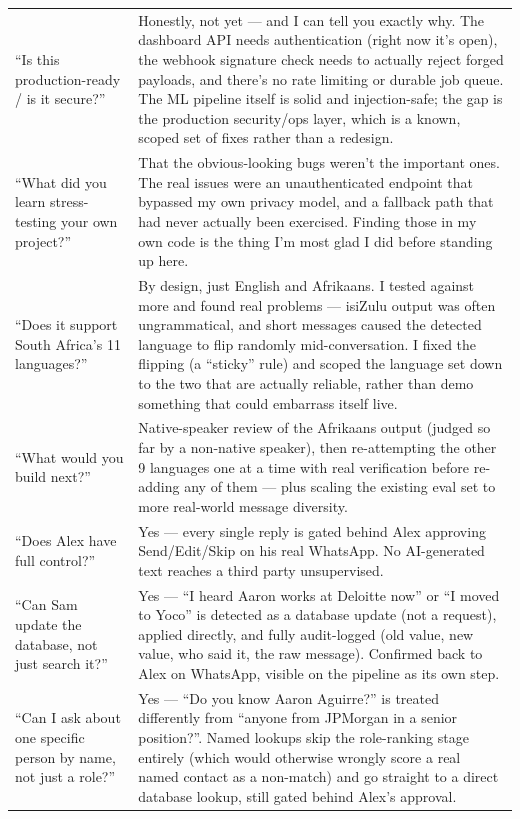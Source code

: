 \documentclass[11pt, a4paper]{article}
\begin{document}
\begin{longtable}{@{}p{6.5cm}p{9.5cm}@{}}
``Is this production-ready / is it secure?'' & Honestly, not yet --- and I can tell you exactly why. The dashboard API needs authentication (right now it's open), the webhook signature check needs to actually reject forged payloads, and there's no rate limiting or durable job queue. The ML pipeline itself is solid and injection-safe; the gap is the production security/ops layer, which is a known, scoped set of fixes rather than a redesign. \\
``What did you learn stress-testing your own project?'' & That the obvious-looking bugs weren't the important ones. The real issues were an unauthenticated endpoint that bypassed my own privacy model, and a fallback path that had never actually been exercised. Finding those in my own code is the thing I'm most glad I did before standing up here. \\
``Does it support South Africa's 11 languages?'' & By design, just English and Afrikaans. I tested against more and found real problems --- isiZulu output was often ungrammatical, and short messages caused the detected language to flip randomly mid-conversation. I fixed the flipping (a ``sticky'' rule) and scoped the language set down to the two that are actually reliable, rather than demo something that could embarrass itself live. \\
``What would you build next?'' & Native-speaker review of the Afrikaans output (judged so far by a non-native speaker), then re-attempting the other 9 languages one at a time with real verification before re-adding any of them --- plus scaling the existing eval set to more real-world message diversity. \\
``Does Alex have full control?'' & Yes --- every single reply is gated behind Alex approving Send/Edit/Skip on his real WhatsApp. No AI-generated text reaches a third party unsupervised. \\
``Can Sam update the database, not just search it?'' & Yes --- ``I heard Aaron works at Deloitte now'' or ``I moved to Yoco'' is detected as a database update (not a request), applied directly, and fully audit-logged (old value, new value, who said it, the raw message). Confirmed back to Alex on WhatsApp, visible on the pipeline as its own step. \\
``Can I ask about one specific person by name, not just a role?'' & Yes --- ``Do you know Aaron Aguirre?'' is treated differently from ``anyone from JPMorgan in a senior position?''. Named lookups skip the role-ranking stage entirely (which would otherwise wrongly score a real named contact as a non-match) and go straight to a direct database lookup, still gated behind Alex's approval. \\
\bottomrule
\end{longtable}
\end{document}
